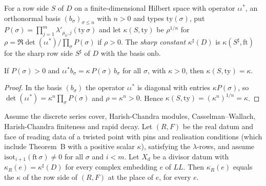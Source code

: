 For a row side $S$ of $D$ on a finite-dimensional Hilbert space with operator $\iota\iota^*$, an orthonormal basis $(b_\sigma)_{\sigma\le n}$
with $n>0$ and types $\mathrm{ty}(\sigma)$, put $P(\sigma)=\prod_{j=1}^m\lambda'_{\mu_0,j}(\mathrm{ty}\,\sigma)$ and let $\kappa(S,\mathrm{ty})$ be
$\rho^{1/n}$ for $\rho=\Re\det(\iota\iota^*)/\prod_\sigma P(\sigma)$ if $\rho>0$. The \emph{sharp constant} $\kappa^\sharp(D)$ is
$\kappa(S^\sharp,\mathrm{ft})$ for the sharp row side $S^\sharp$ of $D$ with the basis $\mathrm{onb}$.

\begin{lemma}\label{pf:open0:kapofeigen}
If $P(\sigma)>0$ and $\iota\iota^*b_\sigma=\kappa\,P(\sigma)\,b_\sigma$ for all $\sigma$, with $\kappa>0$, then $\kappa(S,\mathrm{ty})=\kappa$.
\end{lemma}

\begin{proof}
In the basis $(b_\sigma)$ the operator $\iota\iota^*$ is diagonal with entries $\kappa P(\sigma)$, so
$\det(\iota\iota^*)=\kappa^n\prod_\sigma P(\sigma)$ and $\rho=\kappa^n>0$. Hence $\kappa(S,\mathrm{ty})=(\kappa^n)^{1/n}=\kappa$.
\end{proof}

\begin{theorem}\label{pf:open0:kappa}
Assume the discrete series cover, Harish-Chandra modules, Casselman--Wallach, Harish-Chandra finiteness and rapid decay. Let
$(R,F)$ be the real datum and face of reading data of a twisted point with pins and realisation conditions (which include
Theorem~B with a positive scalar $\kappa$), satisfying the $\lambda$-rows, and assume $\mathrm{isot}_{i+1}(\mathrm{ft}\,\sigma)\ne0$ for all
$\sigma$ and $i<m$. Let $X_d$ be a divisor datum with $\kappa_R(e)=\kappa^\sharp(D)$ for every complex embedding $e$ of $\mathit{LL}$.
Then $\kappa_R(e)$ equals the $\kappa$ of the row side of $(R,F)$ at the place of $e$, for every $e$.
\
\
\ 
\end{theorem}

